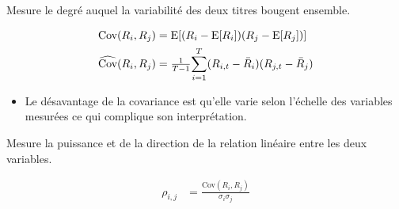 \documentclass[10pt, french]{article}
\begin{document}
\begin{multicols*}{2}
\begin{definitionNOHFILL}[Covariance]
Mesure le degré auquel la variabilité des deux titres bougent ensemble.

\begin{align*}
	\text{Cov}(R_{i}, R_{j})
	&=	\text{E}[(R_{i}	-	\text{E}[R_{i}])(R_{j}	-	\text{E}[R_{j}])]	\\
	\widehat{\text{Cov}}	(R_{i}, R_{j})
	&=	\tfrac{1}{T	-	1} \overset{T}{\underset{i	=	1}{\sum}} (R_{i, t}	-	\bar{R}_{i})(R_{j, t}	-	\bar{R}_{j})	\\
\end{align*}

\tcbline

\begin{itemize}
	\item	Le désavantage de la covariance est qu'elle varie selon l'échelle des variables mesurées ce qui complique son interprétation.
\end{itemize}
\end{definitionNOHFILL}

\begin{definitionNOHFILL}[Corrélation]
Mesure la puissance et de la direction de la relation linéaire entre les deux variables.

\begin{align*}
	\rho_{i, j}
	&=	\frac{\text{Cov}	(R_{i}, R_{j})}{\sigma_{i}\sigma_{j}}
\end{align*}

\begin{center}

\end{center}
\end{definitionNOHFILL}
\end{multicols*}
\end{document}
